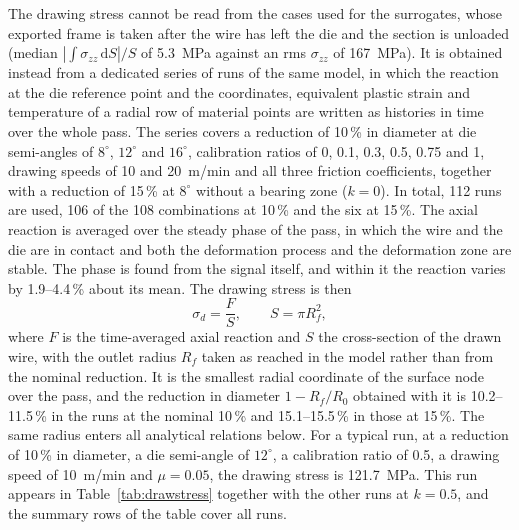 \documentclass[pdflatex,sn-basic,Numbered]{sn-jnl}
\begin{document}
The drawing stress cannot be read from the cases used for the surrogates, whose exported frame is
taken after the wire has left the die and the section is unloaded (median
$|\int\sigma_{zz}\,\mathrm{d}S|/S$ of 5.3~MPa against an rms $\sigma_{zz}$ of 167~MPa).
It is obtained instead from a dedicated series of runs of the same model, in which the reaction at
the die reference point and the coordinates, equivalent plastic strain and temperature of a
radial row of material points are written as histories in time over the whole pass. The series
covers a reduction of 10\,\% in diameter at die semi-angles of $8^\circ$, $12^\circ$ and
$16^\circ$, calibration ratios of 0, 0.1, 0.3, 0.5, 0.75 and 1, drawing speeds of 10 and 20~m/min and all three friction
coefficients, together with a reduction of 15\,\% at $8^\circ$ without a bearing zone ($k = 0$). In total, 112 runs are
used, 106 of the 108 combinations at 10\,\% and the six at 15\,\%.
The axial reaction is averaged over the steady phase of the pass, in which the wire and the die
are in contact and both the deformation process and the deformation zone are stable. The phase
is found from the signal itself, and within it the reaction varies by 1.9--4.4\,\% about its
mean. The drawing stress is then
\begin{equation}
\sigma_d = \frac{F}{S}, \qquad S = \pi R_f^2,
\label{eq:sigma-d}
\end{equation}
where $F$ is the time-averaged axial reaction and $S$ the cross-section of the drawn wire, with
the outlet radius $R_f$ taken as reached in the model rather than from the nominal reduction. It is
the smallest radial coordinate of the surface node over the pass, and the reduction in diameter
$1-R_f/R_0$ obtained with it is 10.2--11.5\,\% in the runs at the nominal 10\,\% and 15.1--15.5\,\%
in those at 15\,\%. The same radius enters all analytical relations below.
For a typical run, at a reduction of 10\,\% in
diameter, a die semi-angle of $12^\circ$, a calibration ratio of 0.5, a drawing speed of 10~m/min and
$\mu = 0.05$, the drawing stress is 121.7~MPa. This run appears in Table~\ref{tab:drawstress}
together with the other runs at $k = 0.5$, and the summary rows of the table cover all runs.
\end{document}

